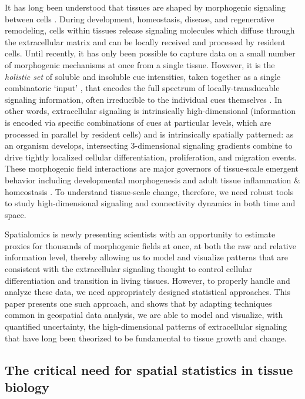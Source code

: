 \documentclass[10pt,letterpaper]{article}
\begin{document}
It has long been understood that tissues are shaped by morphogenic signaling between cells \cite{Vainio1997,Basson2012,Hagolani2019,Wu2023}. During development, homeostasis, disease, and regenerative remodeling, cells within tissues release signaling molecules which diffuse through the extracellular matrix and can be locally received and processed by resident cells. Until recently, it has only been possible to capture data on a small number of morphogenic mechanisms at once from a single tissue. However, it is the \textit{holistic set} of soluble and insoluble cue intensities, taken together as a single combinatoric `input' \cite{Li2019,Klumpe2022,Granados2024}, that encodes the full spectrum of locally-transducable signaling information, often irreducible to the individual cues themselves \cite{Brennan2012,Ellison2016,Scuderi2025}. In other words, extracellular signaling is intrinsically high-dimensional (information is encoded via specific combinations of cues at particular levels, which are processed in parallel by resident cells) and is intrinsically spatially patterned: as an organism develops, intersecting 3-dimensional signaling gradients combine to drive tightly localized cellular differentiation, proliferation, and migration events. These morphogenic field interactions are major governors of tissue-scale emergent behavior including developmental morphogenesis and adult tissue inflammation \& homeostasis \cite{Weaver1997,Hironaka2012,Meizlish2021,Kicheva2023}. To understand tissue-scale change, therefore, we need robust tools to study high-dimensional signaling and connectivity dynamics in both time and space.

Spatialomics is newly presenting scientists with an opportunity to estimate proxies for thousands of morphogenic fields at once, at both the raw and relative information level, thereby allowing us to model and visualize patterns that are consistent with the extracellular signaling thought to control cellular differentiation and transition in living tissues. However, to properly handle and analyze these data, we need appropriately designed statistical approaches. This paper presents one such approach, and shows that by adapting techniques common in geospatial data analysis, we are able to model and visualize, with quantified uncertainty, the high-dimensional patterns of extracellular signaling that have long been theorized to be fundamental to tissue growth and change.

\subsection*{The critical need for spatial statistics in tissue biology}
\end{document}
